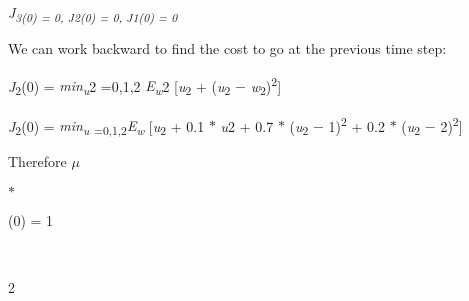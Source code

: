 \documentclass[12pt,twoside]{article}
\begin{document}
\vspace{\baselineskip}
{\fontsize{10pt}{12.0pt}\selectfont \textit{J\textsubscript{3(0) = 0, J2(0) = 0, J1(0) = 0}}\par}\par


\vspace{\baselineskip}
{\fontsize{10pt}{12.0pt}\selectfont We can work backward to find the cost to go at the previous time step:\par}\par


\vspace{\baselineskip}
\begin{Center}
{\fontsize{10pt}{12.0pt}\selectfont \textit{J}\textsubscript{2}(0) = \textit{min\textsubscript{u}}2 =0,1,2 \textit{E\textsubscript{w}}2 [\textit{u}\textsubscript{2} + (\textit{u}\textsubscript{2} $-$  \textit{w}\textsubscript{2})\textsuperscript{2}]\par}
\end{Center}\par


\vspace{\baselineskip}
\begin{Center}
{\fontsize{10pt}{12.0pt}\selectfont \textit{J}\textsubscript{2}(0) = \textit{min\textsubscript{u} }\textsubscript{=0,1,2}\textit{E\textsubscript{w} }[\textit{u}\textsubscript{2} + 0.1 $\ast$  \textit{u}2 + 0.7 $\ast$  (\textit{u}\textsubscript{2} $-$  1)\textsuperscript{2} + 0.2 $\ast$  (\textit{u}\textsubscript{2} $-$  2)\textsuperscript{2}]\par}
\end{Center}\par


\vspace{\baselineskip}

\vspace{\baselineskip}

\vspace{\baselineskip}
Therefore \textit{$ \mu $ }{\fontsize{7pt}{8.4pt}$\ast$  \par}(0) = 1\par

\begin{FlushLeft}
\\
{\fontsize{6pt}{7.2pt} \tabto{1.1in} 2 \tabto{1.89in} {\fontsize{7pt}{8.4pt}\par}\par}
\end{FlushLeft}\par
\end{document}
